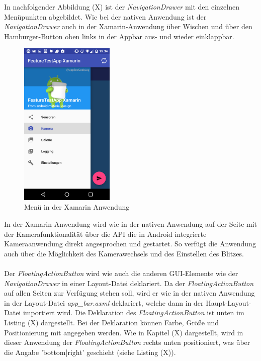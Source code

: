 In nachfolgender Abbildung (X) ist der \textit{NavigationDrawer} mit den einzelnen Menüpunkten abgebildet. Wie bei der nativen Anwendung ist der \textit{NavigationDrawer} auch in der Xamarin-Anwendung über Wischen und über den Hamburger-Button oben links in der Appbar aus- und wieder einklappbar.
\clearpage

\begin{figure}[h]
	\centering
	\includegraphics[width=0.4\textwidth]{Bilder/Screenshot_20170328-193448.PNG}
	\caption{Menü in der Xamarin Anwendung}
	\label{fig:MenuXamarin}
\end{figure}

In der Xamarin-Anwendung wird wie in der nativen Anwendung auf der Seite mit der Kamerafunktionalität über die API die in Android integrierte Kameraanwendung direkt angesprochen und gestartet. So verfügt die Anwendung auch über die Möglichkeit des Kamerawechsels und des Einstellen des Blitzes. 
\\
\\
Der \textit{FloatingActionButton} wird wie auch die anderen GUI-Elemente wie der \textit{NavigationDrawer} in einer Layout-Datei deklariert. Da der \textit{FloatingActionButton} auf allen Seiten zur Verfügung stehen soll, wird er wie in der nativen Anwendung in der Layout-Datei \textit{app\_bar.axml} deklariert, welche dann in der Haupt-Layout-Datei importiert wird. Die Deklaration des \textit{FloatingActionButton} ist unten im Listing (X) dargestellt. Bei der Deklaration können Farbe, Größe und Positionierung mit angegeben werden. Wie in Kapitel (X) dargestellt, wird in dieser Anwendung der \textit{FloatingActionButton} rechts unten positioniert, was über die Angabe 'bottom|right' geschieht (siehe Listing (X)). 
\clearpage

